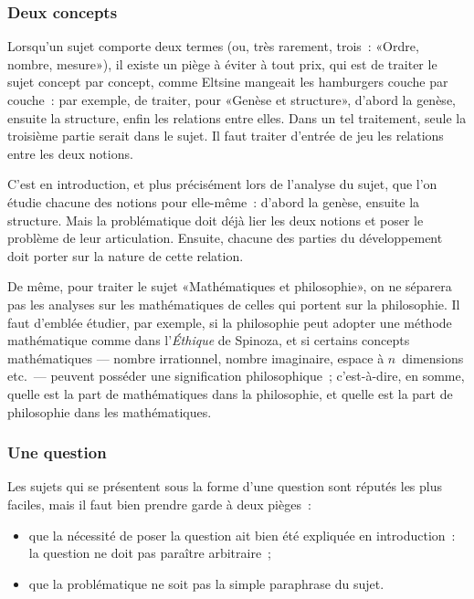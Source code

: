 \documentclass[a4paper,11pt]{article}
\newcommand{\cad}{c'est-à-dire}
\begin{document}
\subsubsection{Deux concepts}

Lorsqu'un sujet comporte deux termes (ou, très rarement, trois~: «Ordre,
nombre, mesure»), il existe un piège à éviter à tout prix, qui est de
traiter le sujet concept par concept, comme Eltsine mangeait les
hamburgers couche par couche~: par exemple, de traiter, pour «Genèse et
structure», d'abord la genèse, ensuite la structure, enfin les relations
entre elles. Dans un tel traitement, seule la troisième partie serait
dans le sujet. Il faut traiter d'entrée de jeu les relations entre les
deux notions.

\par

C'est en introduction, et plus précisément lors de l'analyse du sujet,
que l'on étudie chacune des notions pour elle-même~: d'abord la genèse,
ensuite la structure. Mais la problématique doit déjà lier les deux
notions et poser le problème de leur articulation. Ensuite, chacune des
parties du développement doit porter sur la nature de cette relation.

\par

De même, pour traiter le sujet «Mathématiques et philosophie», on ne
séparera pas les analyses sur les mathématiques de celles qui portent
sur la philosophie. Il faut d'emblée étudier, par exemple, si la
philosophie peut adopter une méthode mathématique comme dans
l'\emph{Éthique} de Spinoza, et si certains concepts mathématiques ---
nombre irrationnel, nombre imaginaire, espace à $n$~dimensions etc.~---
peuvent posséder une signification philosophique~; \cad{}, en somme,
quelle est la part de mathématiques dans la philosophie, et quelle est
la part de philosophie dans les mathématiques.



\subsubsection{Une question}

Les sujets qui se présentent sous la forme d'une question sont réputés
les plus faciles, mais il faut bien prendre garde à deux pièges~:
\begin{itemize}
\item que la nécessité de poser la question ait bien été expliquée en
  introduction~: la question ne doit pas paraître arbitraire~;
\item que la problématique ne soit pas la simple paraphrase du sujet.
\end{itemize}
\end{document}
